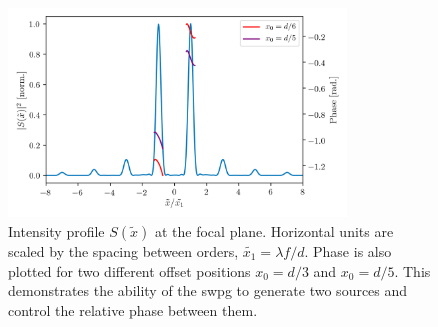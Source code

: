 \begin{figure}
	\centering
	\includegraphics[width=0.8\textwidth]{figures/Two_source/intensity_and_phase.png}
	\caption{Intensity profile $S(\tilde{x})$ at the focal plane. Horizontal units are scaled by the spacing between orders, $\tilde{x_1}=\lambda f/d$.  Phase is also plotted for two different offset positions $x_0=d/3$ and $x_0=d/5$.  This demonstrates the ability of the \gls{swpg} to generate two sources and control the relative phase between them.}
	\label{fig:s^2}
\end{figure}


